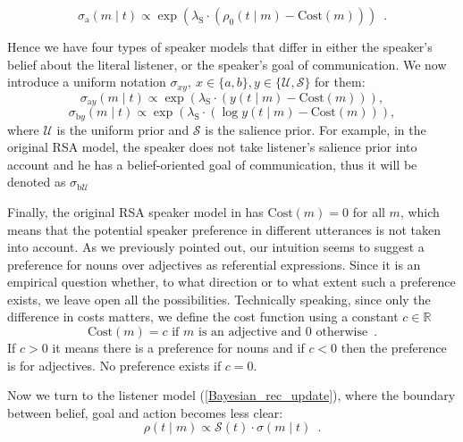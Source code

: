 \begin{equation} \label{Bayesian_speaker_action}
\sigma_\mathrm{a}(m \mid t) \propto \exp(\lambda_\mathrm{S} \cdot (\rho_0(t\mid m)-\mbox{Cost}(m))) \enspace .
\end{equation}

Hence we have four types of speaker models that differ in either the speaker's belief about the literal listener, or the speaker's goal of communication. We now introduce a uniform notation $\sigma_{xy},\ x\in\{a,b\},y\in\{\mathcal{U},\mathcal{S}\}$ for them:
\begin{equation} \label{Bayesian_speaker_uniform_action}
\sigma_{\mathrm{a}y}(m \mid t) \propto \exp(\lambda_\mathrm{S} \cdot ( y(t\mid m)-\mbox{Cost}(m))),
\end{equation}
\begin{equation} \label{Bayesian_speaker_uniform_belief}
\sigma_{\mathrm{b}y}(m \mid t) \propto \exp(\lambda_\mathrm{S} \cdot (\log y(t\mid m)-\mbox{Cost}(m))),
\end{equation}
where $\mathcal{U}$ is the uniform prior and $\mathcal{S}$ is the salience prior. For example, in the original RSA model, the speaker does not take listener's salience prior into account and he has a belief-oriented goal of communication, thus it will be denoted as $\sigma_{\mathrm{b}\mathcal{U}}$

Finally, the original RSA speaker model in \cite{Frank} has $\mbox{Cost}(m)=0$ for all $m$, which means that the potential speaker preference in different utterances is not taken into account. As we previously pointed out, our intuition seems to suggest a preference for nouns over adjectives as referential expressions. Since it is an empirical question whether, to what direction or to what extent such a preference exists, we leave open all the possibilities. Technically speaking, since only the difference in costs matters, we define the cost function using a constant $c\in \mathbb{R}$
\begin{equation} \label{cost}
\mbox{Cost}(m)=c \mbox{ if } m \mbox{ is an adjective and }0 \mbox{ otherwise} \enspace . 
\end{equation}
If $c>0$ it means there is a preference for nouns and if $c<0$ then the preference is for adjectives. No preference exists if $c=0$.

Now we turn to the listener model (\ref{Bayesian_rec_update}), where the boundary between belief, goal and action becomes less clear:
$$\rho(t \mid m) \propto \mathcal{S}(t)\cdot \sigma(m \mid t) \enspace . $$

